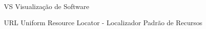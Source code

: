 \begin{siglas}
  \item[VS] Visualização de Software
  \item[URL] Uniform Resource Locator - Localizador Padrão de Recursos
\end{siglas}
